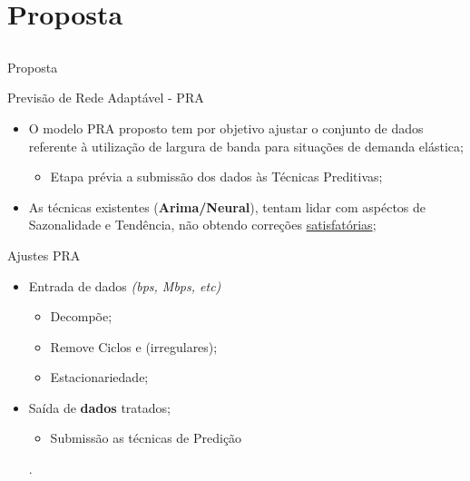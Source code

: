 \documentclass[aspectratio=169]{beamer}
\begin{document}
\section{Proposta}
\subsection{}
\begin{frame}{Proposta}
    \begin{block}{Previsão de Rede Adaptável - PRA}
        \begin{itemize}
            \item O modelo PRA proposto tem por objetivo ajustar o conjunto de dados referente à utilização de largura de banda para situações de demanda elástica;
            \begin{itemize}[square]\footnotesize
                \item Etapa prévia a submissão dos dados às Técnicas Preditivas; 
            \end{itemize}
            \item As técnicas existentes (\textbf{Arima/Neural}), tentam lidar com aspéctos de Sazonalidade e Tendência, não obtendo correções \underline{satisfatórias};
            
            
        \end{itemize}
    \end{block}
    \begin{block}{Ajustes PRA}
    \begin{itemize}
        \item Entrada de dados \emph{(bps, Mbps, etc)}
    
        \begin{itemize}[triangle]\footnotesize
            \item Decompõe;
            \item Remove Ciclos e (irregulares);
            \item Estacionariedade;
            
        \end{itemize}
        \item Saída de \textbf{dados} tratados;
        \begin{itemize}[square]\footnotesize
            \item Submissão as técnicas de Predição 
        \end{itemize}
        .
    \end{itemize}
    \end{block}
\end{frame}
\end{document}

